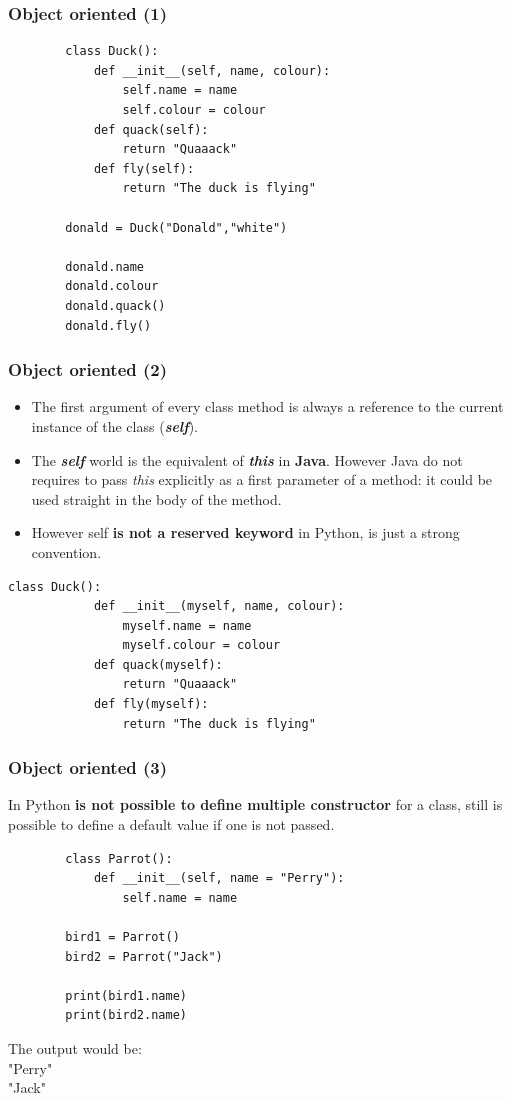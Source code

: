 \documentclass[xcolor ={table,usenames,dvipsnames}]{beamer}
\theoremstyle{definition}
\begin{document}
	\begin{frame}[fragile]
		\frametitle{Object oriented (1)}
	\begin{lstlisting}
		class Duck():
			def __init__(self, name, colour):
				self.name = name
				self.colour = colour
			def quack(self):
				return "Quaaack"
			def fly(self):
				return "The duck is flying"
		
		donald = Duck("Donald","white")
				
		donald.name
		donald.colour
		donald.quack()
		donald.fly()
		\end{lstlisting}
	\end{frame}

	\begin{frame}[fragile]
		\frametitle{Object oriented (2)}
		\begin{itemize}
			\item The first argument of every class method is always a reference to the current instance of the class (\textit{\textbf{self}}).
			\item The \textbf{\textit{self}} world is the equivalent of \textbf{\textit{this}} in \textbf{Java}. However Java do not requires to pass \textit{this} explicitly as a first parameter of a method: it could be used straight in the body of the method.
			\item However self\textbf{ is not a reserved keyword} in Python, is just a strong convention.
		\end{itemize}
		\begin{lstlisting}[basicstyle=\fontsize{2}{4}\selectfont\ttfamily\tiny]
		class Duck():
			def __init__(myself, name, colour):
				myself.name = name
				myself.colour = colour
			def quack(myself):
				return "Quaaack"	
			def fly(myself):
				return "The duck is flying"
		\end{lstlisting}
	\end{frame}

	\begin{frame}[fragile]
		\frametitle{Object oriented (3)}
		In Python \textbf{is not possible to define multiple constructor} for a class, still is possible to define a default value if one is not passed.
		
		\begin{lstlisting}
		class Parrot():
			def __init__(self, name = "Perry"):
				self.name = name
		
		bird1 = Parrot()
		bird2 = Parrot("Jack")
		
		print(bird1.name)
		print(bird2.name)
		\end{lstlisting}
		The output would be:\\
		"Perry"\\
		"Jack"
	\end{frame}
\end{document}
